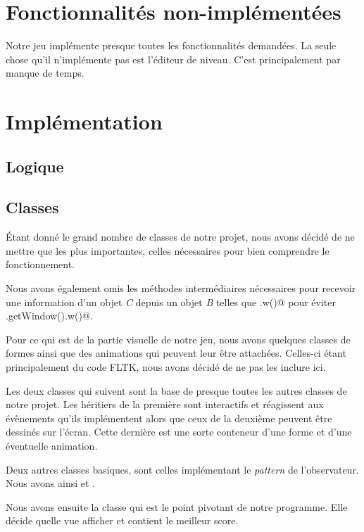 \documentclass[11pt,a4paper]{article}
\newcommand{\addcode}[3]{
	\begin{figure}[H]
		\centering
		
	\end{figure}
}
\begin{document}
\section{Fonctionnalités non-implémentées}
Notre jeu implémente presque toutes les fonctionnalités
demandées.
La seule chose qu'il n'implémente pas est l'éditeur de niveau.
C'est principalement par manque de temps.

\section{Implémentation}
\subsection{Logique}

\subsection{Classes}

Étant donné le grand nombre de classes de notre projet, nous
avons décidé de ne mettre que les plus importantes, celles
nécessaires pour bien comprendre le fonctionnement.

Nous avons également omis les méthodes intermédiaires
nécessaires pour recevoir une information d'un objet
\emph{C} depuis un objet \emph{B} telles que \verb@b.w()@ pour
éviter \verb@b.getWindow().w()@.

Pour ce qui est de la partie visuelle de notre jeu, nous
avons quelques classes de formes ainsi que des animations
qui peuvent leur être attachées. Celles-ci étant
principalement du code FLTK, nous avons décidé de ne pas les
inclure ici.

Les deux classes qui suivent sont la base de presque toutes
les autres classes de notre projet. Les héritiers de la
première sont interactifs et réagissent aux évènements
qu'ils implémentent alors que ceux de la deuxième peuvent
être dessinés sur l'écran. Cette dernière est une sorte conteneur d'une forme et
d'une éventuelle animation.

\addcode{code/interactive.hpp}{C++}{}{}
\addcode{code/drawableContainer.hpp}{C++}{}{}

Deux autres classes basiques, sont celles implémentant le
\emph{pattern} de l'observateur. Nous avons ainsi \verb@Observer@
et \verb@Subject@.

Nous avons ensuite la classe \verb@Game@ qui est le point
pivotant de notre programme. Elle décide quelle vue
afficher et contient le meilleur score.
\end{document}
